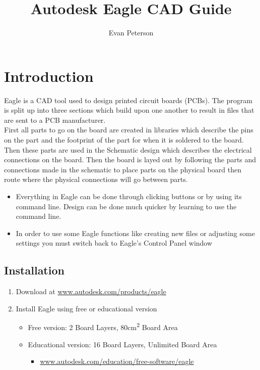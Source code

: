 \documentclass{article}
\title{Autodesk Eagle CAD Guide}
\author{Evan Peterson}
\begin{document}
\maketitle{}
\setcounter{tocdepth}{2}
\tableofcontents
\pagebreak

\section{Introduction}
Eagle is a CAD tool used to design printed circuit boards (PCBs). The program is
split up into three sections which build upon one another to result in files
that are sent to a PCB manufacturer.\\
First all parts to go on the board are created in libraries which describe the
pins on the part and the footprint of the part for when it is soldered to the
board. Then these parts are used in the Schematic design which describes the
electrical connections on the board. Then the board is layed out by following
the parts and connections made in the schematic to place parts on the physical
board then route where the physical connections will go between parts.
\begin{tcolorbox} [title=Tips \& Tricks]
    \begin{itemize}
        \item Everything in Eagle can be done through clicking buttons or by
        using its command line. Design can be done much quicker by learning to
        use the command line.
        \item In order to use some Eagle functions like creating new files or
        adjusting some settings you must switch back to Eagle's Control Panel
        window
    \end{itemize}
\end{tcolorbox}

\subsection{Installation}
\begin{enumerate}
    \item Download at \url{www.autodesk.com/products/eagle}
    \item Install Eagle using free or educational version
    \begin{itemize}
        \item Free version: 2 Board Layers, 80cm\textsuperscript{2} Board Area
        \item Educational version: 16 Board Layers, Unlimited Board Area
        \begin{itemize}
            \item \url{www.autodesk.com/education/free-software/eagle}
        \end{itemize}
    \end{itemize}
\end{enumerate}
\end{document}

